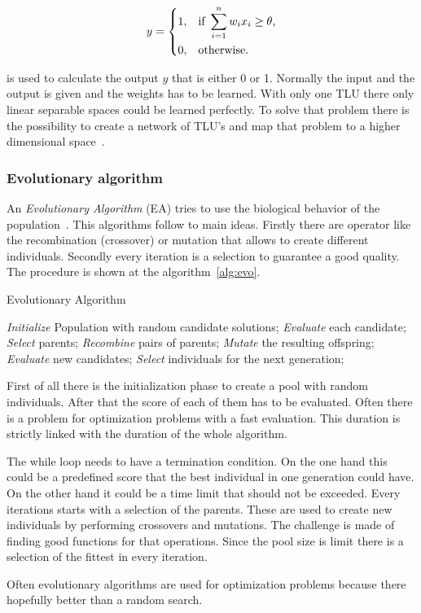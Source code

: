 \begin{equation}
    y = 
\begin{dcases}
    1, & \text{if } \sum_{i=1}^n w_{i} x_{i} \geq \theta \text{,} \\
    0, & \text{otherwise.}
\end{dcases}
\end{equation}

is used to calculate the output $y$ that is either 0 or 1.
Normally the input and the output is given and the weights has to be learned. With only one TLU there only linear separable spaces could be learned perfectly.
To solve that problem there is the possibility to create a network of TLU's and map that problem to a higher dimensional space~\cite{ci_kruse}.




\subsubsection{Evolutionary algorithm} 
An \textit{Evolutionary Algorithm} (EA) tries to use the biological behavior of the population~\cite{evo}. 
This algorithms follow to main ideas. Firstly there are operator like the recombination (crossover) or
mutation that allows to create different individuals. Secondly every iteration is a selection to guarantee
a good quality.
The procedure is shown at the algorithm~\ref{alg:evo}. 


\begin{algorithm}
\caption{Evolutionary Algorithm~\cite{evo}}
\label{alg:evo}
\begin{algorithmic}
\State \emph{Initialize} Population with random candidate solutions;
\State \emph{Evaluate} each candidate;
\State \emph{Select} parents;
\State \emph{Recombine} pairs of parents;
\State \emph{Mutate} the resulting offspring;
\State \emph{Evaluate} new candidates;
\State \emph{Select} individuals for the next generation;
\EndWhile
\end{algorithmic}
\end{algorithm}

First of all there is the initialization phase to create a pool with random
individuals. After that the score of each of them has to be evaluated. Often there
is a problem for optimization problems with a fast evaluation. This duration is
strictly linked with the duration of the whole algorithm.

The while loop needs to have a termination condition. On the one hand this could be
a predefined score that the best individual in one generation could have. On the other 
hand it could be a time limit that should not be exceeded.
Every iterations starts with a selection of the parents.
These are used to create new individuals by performing crossovers and mutations.
The challenge is made of finding good functions for that operations. 
Since the pool size is limit there is a selection of the fittest in every iteration.

Often evolutionary algorithms are used for optimization problems because there
hopefully better than a random search.


